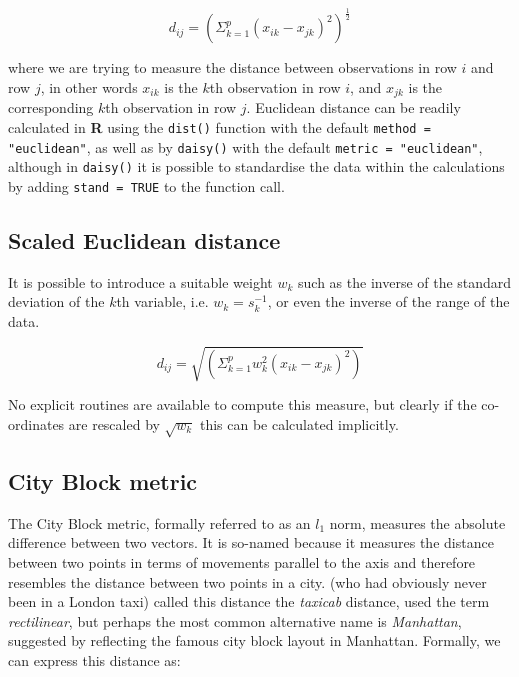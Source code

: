 \begin{displaymath}
\label{euclideanF}
d_{ij} =  \left( \Sigma_{k=1}^{p} (x_{ik} - x_{jk})^2 \right)^{\frac{1}{2}}
\end{displaymath}

where we are trying to measure the distance between observations in row $i$ and row $j$, in other words $x_{ik}$ is the $k$th observation in row $i$, and $x_{jk}$ is the corresponding $k$th observation in row $j$.   Euclidean distance can be readily calculated in \textbf{R} using the \verb+dist()+ function with the default \verb+method = "euclidean"+, as well as by \verb+daisy()+ with the default \verb+metric = "euclidean"+, although in \verb+daisy()+ it is possible to standardise the data within the calculations by adding \verb+stand = TRUE+ to the function call.
 

\subsection{Scaled Euclidean distance}
\label{scaledeuclidean}

It is possible to introduce a suitable weight $w_{k}$ such as the inverse of the standard deviation of the $k$th variable, i.e. $w_{k} = s_{k}^{-1}$, or even the inverse of the range of the data.

\begin{displaymath}
\label{scaledeuclideanF}
d_{ij} = \sqrt{\left( \Sigma_{k=1}^{p} w_{k}^{2}(x_{ik} - x_{jk})^2 \right)}
\end{displaymath}

No explicit routines are available to compute this measure, but clearly if the co-ordinates are rescaled by $\sqrt{w_{k}}$ this can be calculated implicitly.

\subsection{City Block metric}
\label{cityblock}

The City Block metric, formally referred to as an $l_{1}$ norm, measures the absolute difference between two vectors.   It is so-named because it measures the distance between two points in terms of movements parallel to the axis and therefore resembles the distance between two points in a city.   \cite{Krause:1975} (who had obviously never been in a London taxi) called this distance the \emph{taxicab} distance, \cite{Brandeau+Chiu:1988} used the term \emph{rectilinear}, but perhaps the most common alternative name is \emph{Manhattan}, suggested by \cite{Larson+Sadiq:1983} reflecting the famous city block layout in Manhattan.   Formally, we can express this distance as:

